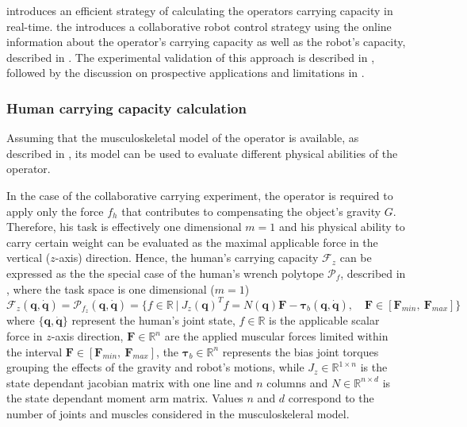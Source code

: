  introduces an efficient strategy of calculating the operators carrying capacity in real-time.  the introduces a collaborative robot control strategy using the online information about the operator's carrying capacity as well as the robot's capacity, described in  . The experimental validation of this approach is described in  , followed by the discussion on prospective applications and limitations in  .


\subsubsection{Human carrying capacity calculation}
\label{sec:human_carrying_capacity}

Assuming that the musculoskeletal model of the operator is available, as described in  , its model can be used to evaluate different physical abilities of the operator. 

In the case of the collaborative carrying experiment, the operator is required to apply only the force $f_{h}$ that contributes to compensating the object's gravity $G$. Therefore, his task is effectively one dimensional $m=1$ and his physical ability to carry certain weight can be evaluated as the maximal applicable force in the vertical ($z$-axis) direction. Hence, the human's carrying capacity $\mathcal{F}_z$ can be expressed as the the special case of the human's wrench polytope $\mathcal{P}_{f}$, described in  , where the task space is one dimensional ($m=1$)
\begin{equation}
     \mathcal{F}_z(\bm{q},\dot{\bm{q}}) = \mathcal{P}_{f_z} (\bm{q},\dot{\bm{q}}) = \{ f \in \mathbb{R} ~|~ J_{z}(\bm{q})^Tf=N(\bm{q})\bm{F} - \bm{\tau}_b(\bm{q},\dot{\bm{q}}), \quad \bm{F}\in[\bm{F}_{min}, ~\bm{F}_{max}]\}
\end{equation}
where $\{\bm{q},\dot{\bm{q}}\}$ represent the human's joint state, $f \in\mathbb{R}$ is the applicable scalar force in $z$-axis direction, $\bm{F}\in\mathbb{R}^n$ are the applied muscular forces limited within the interval $\bm{F}\in[\bm{F}_{min}, ~\bm{F}_{max}]$, the $\bm{\tau}_{b}\in\mathbb{R}^n$ represents the bias joint torques grouping the effects of the gravity and robot's motions, while $J_{z}\in\mathbb{R}^{1\times n}$ is the state dependant jacobian matrix with one line and $n$ columns and $N\in\mathbb{R}^{n\times d}$ is the state dependant moment arm matrix. Values $n$ and $d$ correspond to the number of joints and muscles considered in the musculoskeleral model.


